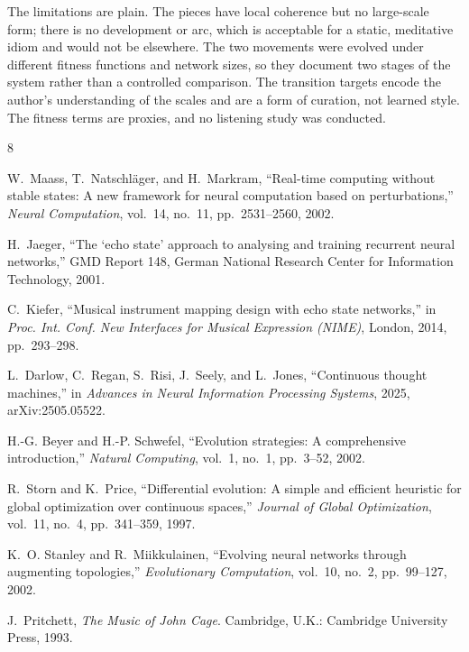 \documentclass[conference]{IEEEtran}
\begin{document}
The limitations are plain. The pieces have local coherence but no large-scale form; there is no development or arc, which is acceptable for a static, meditative idiom and would not be elsewhere. The two movements were evolved under different fitness functions and network sizes, so they document two stages of the system rather than a controlled comparison. The transition targets encode the author's understanding of the scales and are a form of curation, not learned style. The fitness terms are proxies, and no listening study was conducted.

\begin{thebibliography}{8}

W.~Maass, T.~Natschläger, and H.~Markram, ``Real-time computing without stable states: A new framework for neural computation based on perturbations,'' \emph{Neural Computation}, vol.~14, no.~11, pp.~2531--2560, 2002.

H.~Jaeger, ``The `echo state' approach to analysing and training recurrent neural networks,'' GMD Report 148, German National Research Center for Information Technology, 2001.

C.~Kiefer, ``Musical instrument mapping design with echo state networks,'' in \emph{Proc. Int. Conf. New Interfaces for Musical Expression (NIME)}, London, 2014, pp.~293--298.

L.~Darlow, C.~Regan, S.~Risi, J.~Seely, and L.~Jones, ``Continuous thought machines,'' in \emph{Advances in Neural Information Processing Systems}, 2025, arXiv:2505.05522.

H.-G. Beyer and H.-P. Schwefel, ``Evolution strategies: A comprehensive introduction,'' \emph{Natural Computing}, vol.~1, no.~1, pp.~3--52, 2002.

R.~Storn and K.~Price, ``Differential evolution: A simple and efficient heuristic for global optimization over continuous spaces,'' \emph{Journal of Global Optimization}, vol.~11, no.~4, pp.~341--359, 1997.

K.~O. Stanley and R.~Miikkulainen, ``Evolving neural networks through augmenting topologies,'' \emph{Evolutionary Computation}, vol.~10, no.~2, pp.~99--127, 2002.

J.~Pritchett, \emph{The Music of John Cage}. Cambridge, U.K.: Cambridge University Press, 1993.

\end{thebibliography}
\end{document}
